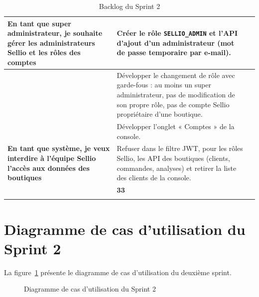 \begin{longtable}{|>{\raggedright\arraybackslash}p{3cm}|>{\raggedright\arraybackslash}p{9cm}|>{\centering\arraybackslash}p{2.3cm}|}
\textbf{En tant que super administrateur, je souhaite gérer les administrateurs Sellio et les rôles des comptes}
& Créer le rôle \texttt{SELLIO\_ADMIN} et l'API d'ajout d'un administrateur (mot de passe temporaire par e-mail). & 1 \\
\cline{2-3}
& Développer le changement de rôle avec garde-fous : au moins un super administrateur, pas de modification de son propre rôle, pas de compte Sellio propriétaire d'une boutique. & 1 \\
\cline{2-3}
& Développer l'onglet « Comptes » de la console. & 1 \\
\hline

\textbf{En tant que système, je veux interdire à l'équipe Sellio l'accès aux données des boutiques}
& Refuser dans le filtre JWT, pour les rôles Sellio, les API des boutiques (clients, commandes, analyses) et retirer la liste des clients de la console. & 1 \\
\hline

\multicolumn{2}{|r|}{\textbf{Total}} & \textbf{33} \\
\hline
\caption{Backlog du Sprint 2}
\label{tab:backlog-sprint2}
\end{longtable}

\section{Diagramme de cas d'utilisation du Sprint 2}
La figure~\ref{fig:cu-sprint2} présente le diagramme de cas d'utilisation du deuxième sprint.
\begin{figure}[H]
    \centering
    \caption{Diagramme de cas d'utilisation du Sprint 2}
    \label{fig:cu-sprint2}
\end{figure}

